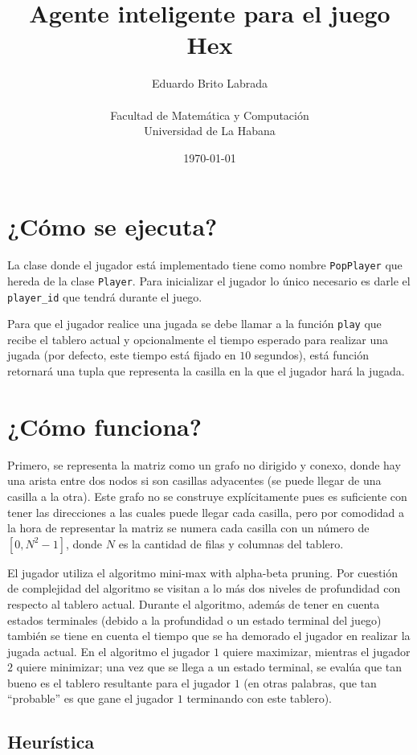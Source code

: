 \documentclass[11pt]{article}
\title{ Agente inteligente para el juego Hex }
\author{ Eduardo Brito Labrada \\ \\ Facultad de Matemática y Computación \\ Universidad de La Habana }
\date{\today}
\begin{document}
\maketitle	

\section{¿Cómo se ejecuta?}

La clase donde el jugador está implementado tiene como nombre \texttt{PopPlayer} que hereda de la clase \texttt{Player}. Para inicializar el jugador lo único necesario es darle el \texttt{player\_id} que tendrá durante el juego. 

Para que el jugador realice una jugada se debe llamar a la función \texttt{play} que recibe el tablero actual y opcionalmente el tiempo esperado para realizar una jugada (por defecto, este tiempo está fijado en $10$ segundos), está función retornará una tupla que representa la casilla en la que el jugador hará la jugada.

\section{¿Cómo funciona?}

Primero, se representa la matriz como un grafo no dirigido y conexo, donde hay una arista entre dos nodos si son casillas adyacentes (se puede llegar de una casilla a la otra). Este grafo no se construye explícitamente pues es suficiente con tener las direcciones a las cuales puede llegar cada casilla, pero por comodidad a la hora de representar la matriz se numera cada casilla con un número de $[0, N^2-1]$, donde $N$ es la cantidad de filas y columnas del tablero.

El jugador utiliza el algoritmo mini-max with alpha-beta pruning. Por cuestión de complejidad del algoritmo se visitan a lo más dos niveles de profundidad con respecto al tablero actual. Durante el algoritmo, además de tener en cuenta estados terminales (debido a la profundidad o un estado terminal del juego) también se tiene en cuenta el tiempo que se ha demorado el jugador en realizar la jugada actual. En el algoritmo el jugador $1$ quiere maximizar, mientras el jugador $2$ quiere minimizar; una vez que se llega a un estado terminal, se evalúa que tan bueno es el tablero resultante para el jugador $1$ (en otras palabras, que tan ``probable'' es que gane el jugador $1$ terminando con este tablero). 

\subsection{Heurística}
\end{document}
